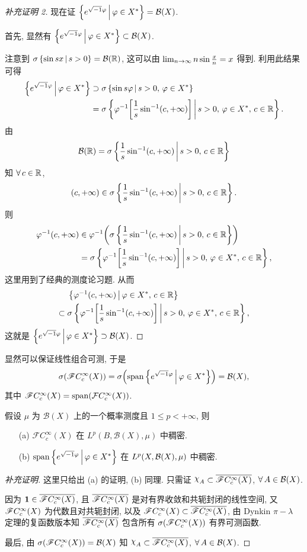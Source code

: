 \begin{proof}[补充证明 2]
现在证 $\jh{e^{\xs\phi}}{\phi\in X^*}=\BB\xk{X}$.\par 
首先, 显然有 $\jh{e^{\xs\phi}}{\phi\in X^*}\subset\BB\xk{X}$.\par 
注意到 $\sigma\jh{\sin sx}{s>0}=\BB\xk{\rr}$, 这可以由 $\lim _{n\to\infty}n\sin\frac{x}{n}=x$ 得到. 利用此结果可得
\begin{align*}
\jh{e^{\xs\phi}}{\phi\in X^*}&\supset\sigma\jh{\sin s\phi}{s>0,\,\phi\in X^*}\\
&=\sigma\jh{\phi^{-1}\zk{\frac{1}{s}\sin ^{-1}\xk{c,+\infty}}}{s>0,\,\phi\in X^*,\,c\in\rr}.
\end{align*}
由
\[\BB\xk{\rr}=\sigma\jh{\frac{1}{s}\sin ^{-1}\xk{c,+\infty}}{s>0,\,c\in\rr}\]
知 $\forall c\in\rr$,
\[\xk{c,+\infty}\in\sigma\jh{\frac{1}{s}\sin ^{-1}\xk{c,+\infty}}{s>0,\,c\in\rr}.\]
则
\begin{align*}
\phi^{-1}\xk{c,+\infty}&\in\phi^{-1}\xk{\sigma\jh{\frac{1}{s}\sin ^{-1}\xk{c,+\infty}}{s>0,\,c\in\rr}}\\
&=\sigma\jh{\phi^{-1}\zk{\frac{1}{s}\sin ^{-1}\xk{c,+\infty}}}{s>0,\,\phi\in X^*,\,c\in\rr},
\end{align*}
这里用到了经典的测度论习题. 从而
\begin{align*}
&\jh{\phi^{-1}\xk{c,+\infty}}{\phi\in X^*,\,c\in\rr}\\
\subset\;&\sigma\jh{\phi^{-1}\zk{\frac{1}{s}\sin ^{-1}\xk{c,+\infty}}}{s>0,\,\phi\in X^*,\,c\in\rr},
\end{align*}
这就是 $\jh{e^{\xs\phi}}{\phi\in X^*}\supset\BB\xk{X}$.
\end{proof}


\begin{remark}[补充]
显然可以保证线性组合可测, 于是
\[\sigma\xk{\SF C_c^\infty\xk{X}}=\sigma\xk{\Span\jh{e^{\xs\phi}}{\phi\in X^*}}=\BB\xk{X},\]
其中 $\SF \cci\xk{X}=\Span\xk{\FF\cci\xk{X}}$.
\end{remark}
\begin{theorem}
假设 $\mu$ 为 $\mathcal{B}(X)$ 上的一个概率测度且 $1\leq p<+\infty$, 则
\begin{enumerate}
\item[\rm(a)] $\mathscr{F}C_c^\infty(X)$ 在 $L^p(B,\mathcal{B}(X),\mu)$ 中稠密.
\item[\rm(b)] $\mathrm{span}\left\{e^{\sqrt{\smash{-}1}\varphi}\,\middle\vert\,\varphi\in X^*\right\}$ 在 $L^p(X,\mathcal{B}\xk{X},\mu)$ 中稠密.
\end{enumerate}
\end{theorem}
\begin{proof}[补充证明]
这里只给出 (a) 的证明, (b) 同理. 只需证 $\rchi_{A}\subset\mean{\SF\cci\xk{X}}$, $\forall A\in\BB\xk{X}$.\par 
因为 $\mathbf{1}\in\mean{\SF\cci\xk{X}}$, 且 $\mean{\SF\cci\xk{X}}$ 是对有界收敛和共轭封闭的线性空间, 又 $\SF\cci\xk{X}$ 为代数且对共轭封闭, 以及 $\SF\cci\xk{X}\subset\mean{\SF\cci\xk{X}}$, 由 Dynkin $\pi-\lambda$ 定理的复函数版本知 $\mean{\SF\cci\xk{X}}$ 包含所有 $\sigma\xk{\SF\cci\xk{X}}$ 有界可测函数.\par 
最后, 由 $\sigma\xk{\SF\cci\xk{X}}=\BB\xk{X}$ 知 $\rchi_{A}\subset\mean{\SF\cci\xk{X}}$, $\forall A\in\BB\xk{X}$.
\end{proof}
